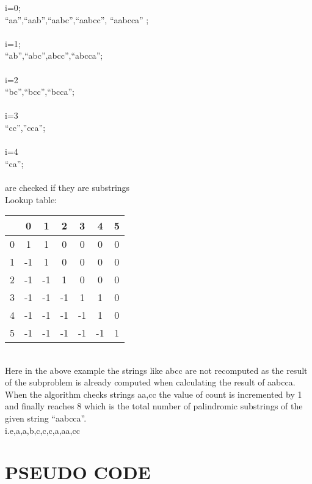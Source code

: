 \documentclass[twocolumn]{article}
\begin{document}
i=0;\\
“aa”,“aab”,“aabc”,“aabcc”, “aabcca” ;\\
\\
i=1;\\
“ab”,“abc”,abcc”,“abcca”;\\
\\
i=2\\
“bc”,“bcc”,“bcca”;\\
\\
i=3\\
“cc”,”cca”;\\
\\
i=4\\
“ca”;\\
\noindent\\
are checked if they are substrings \\

Lookup table:





\begin{center}
	\begin{tabular}{ |c | c | c | c | c | c | c| }
	\hline
	 &0&1&2&3&4&5\\
	 \hline
	0&1&1&0&0&0&0\\
	\hline
1&-1&1&0&0&0&0\\
\hline
2&-1&-1&1&0&0&0\\
\hline
3&-1&-1&-1&1&1&0\\
\hline
4&-1&-1&-1&-1&1&0\\
\hline
5&-1&-1&-1&-1&-1&1\\
	\hline
	\end{tabular}
\end{center}



\noindent\\
Here in the above example the strings like abcc are not recomputed as the result of the subproblem is already computed when calculating the result of aabcca.\\
When the algorithm checks strings aa,cc the value of count is incremented by 1 and finally reaches 8 which is the total number of palindromic substrings of the given string “aabcca”.\\
i.e,a,a,b,c,c,c,a,aa,cc\\
\section*{PSEUDO CODE
}
 
\end{document}

